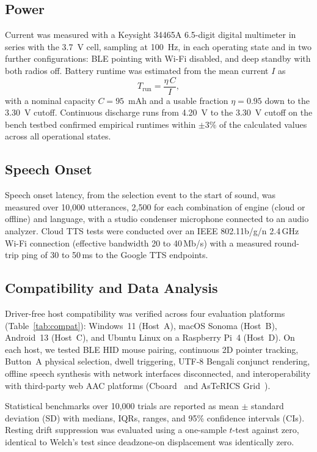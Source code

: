 \documentclass[journal]{IEEEtran}
\begin{document}
\subsection{Power}
Current was measured with a Keysight 34465A 6.5-digit digital multimeter in series with the 3.7~V cell, sampling at 100~Hz, in each operating state and in two further configurations: BLE pointing with Wi-Fi disabled, and deep standby with both radios off. Battery runtime was estimated from the mean current $I$ as
\begin{equation}
T_{\mathrm{run}}=\frac{\eta\,C}{I},
\label{eq:runtime}
\end{equation}
with a nominal capacity $C=95$~mAh and a usable fraction $\eta=0.95$ down to the 3.30~V cutoff. Continuous discharge runs from 4.20~V to the 3.30~V cutoff on the bench testbed confirmed empirical runtimes within $\pm3\%$ of the calculated values across all operational states.

\subsection{Speech Onset}
Speech onset latency, from the selection event to the start of sound, was measured over 10,000 utterances, 2,500 for each combination of engine (cloud or offline) and language, with a studio condenser microphone connected to an audio analyzer. Cloud TTS tests were conducted over an IEEE 802.11b/g/n 2.4\,GHz Wi-Fi connection (effective bandwidth 20 to 40\,Mb/s) with a measured round-trip ping of 30 to 50\,ms to the Google TTS endpoints.

\subsection{Compatibility and Data Analysis}
Driver-free host compatibility was verified across four evaluation platforms (Table~\ref{tab:compat}): Windows~11 (Host~A), macOS Sonoma (Host~B), Android~13 (Host~C), and Ubuntu Linux on a Raspberry Pi~4 (Host~D). On each host, we tested BLE HID mouse pairing, continuous 2D pointer tracking, Button~A physical selection, dwell triggering, UTF-8 Bengali conjunct rendering, offline speech synthesis with network interfaces disconnected, and interoperability with third-party web AAC platforms (Cboard~\cite{cboard} and AsTeRICS Grid~\cite{astericsgrid}).

Statistical benchmarks over 10,000 trials are reported as mean $\pm$ standard deviation (SD) with medians, IQRs, ranges, and 95\% confidence intervals (CIs). Resting drift suppression was evaluated using a one-sample $t$-test against zero, identical to Welch's test since deadzone-on displacement was identically zero.
\end{document}
